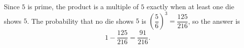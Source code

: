 Since $5$ is prime, the product is a multiple of $5$ exactly when at least one die shows $5$. The probability that no die shows $5$ is $\left(\dfrac{5}{6}\right)^3=\dfrac{125}{216}$, so the answer is
\[
1-\dfrac{125}{216}=\boxed{\dfrac{91}{216}}.
\]
